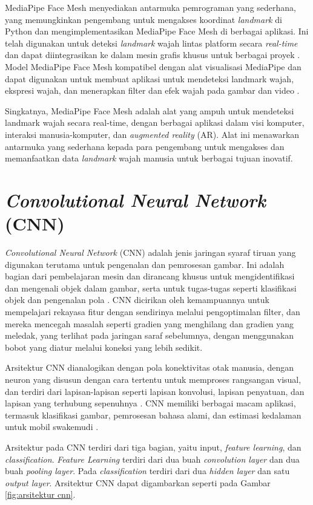 MediaPipe Face Mesh menyediakan antarmuka pemrograman yang sederhana, yang memungkinkan pengembang untuk mengakses koordinat \textit{landmark} di Python dan mengimplementasikan MediaPipe Face Mesh di berbagai aplikasi. Ini telah digunakan untuk deteksi \textit{landmark} wajah lintas platform secara \textit{real-time} dan dapat diintegrasikan ke dalam mesin grafis khusus untuk berbagai proyek \parencite{mediapipe_2020}. Model MediaPipe Face Mesh kompatibel dengan alat visualisasi MediaPipe dan dapat digunakan untuk membuat aplikasi untuk mendeteksi landmark wajah, ekspresi wajah, dan menerapkan filter dan efek wajah pada gambar dan video \parencite{Mediapipe_2023}.

Singkatnya, MediaPipe Face Mesh adalah alat yang ampuh untuk mendeteksi landmark wajah secara real-time, dengan berbagai aplikasi dalam visi komputer, interaksi manusia-komputer, dan \textit{augmented reality} (AR). Alat ini menawarkan antarmuka yang sederhana kepada para pengembang untuk mengakses dan memanfaatkan data \textit{landmark} wajah manusia untuk berbagai tujuan inovatif.

\section{\emph{Convolutional Neural Network} (CNN)}

\emph{Convolutional Neural Network} (CNN) adalah jenis jaringan syaraf tiruan yang digunakan terutama untuk pengenalan dan pemrosesan gambar. Ini adalah bagian dari pembelajaran mesin dan dirancang khusus untuk mengidentifikasi dan mengenali objek dalam gambar, serta untuk tugas-tugas seperti klasifikasi objek dan pengenalan pola \parencite{arm_2023}. CNN dicirikan oleh kemampuannya untuk mempelajari rekayasa fitur dengan sendirinya melalui pengoptimalan filter, dan mereka mencegah masalah seperti gradien yang menghilang dan gradien yang meledak, yang terlihat pada jaringan saraf sebelumnya, dengan menggunakan bobot yang diatur melalui koneksi yang lebih sedikit. 

Arsitektur CNN dianalogikan dengan pola konektivitas otak manusia, dengan neuron yang disusun dengan cara tertentu untuk memproses rangsangan visual, dan terdiri dari lapisan-lapisan seperti lapisan konvolusi, lapisan penyatuan, dan lapisan yang terhubung sepenuhnya \parencite{ibm_2023}. CNN memiliki berbagai macam aplikasi, termasuk klasifikasi gambar, pemrosesan bahasa alami, dan estimasi kedalaman untuk mobil swakemudi \parencite{arm_2023}.

Arsitektur pada CNN terdiri dari tiga bagian, yaitu input, \emph{feature learning}, dan \emph{classification}. \emph{Feature Learning} terdiri dari dua buah \emph{convolution layer} dan dua buah \emph{pooling layer}. Pada \emph{classification} terdiri dari dua \emph{hidden layer} dan satu \emph{output layer}. Arsitektur CNN dapat digambarkan seperti pada Gambar \ref{fig:arsitektur cnn}.

